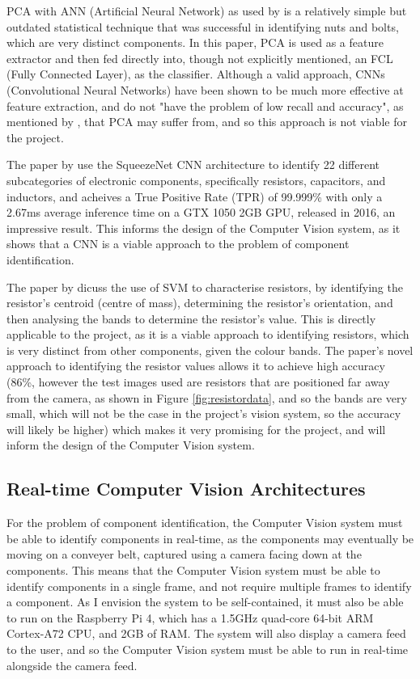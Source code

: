 PCA with ANN (Artificial Neural Network) as used by \citet{Dhenge2013MechanicalNS} is a relatively simple but outdated statistical technique that was successful in identifying nuts and bolts, which are very distinct components. 
In this paper, PCA is used as a feature extractor and then fed directly into, though not explicitly mentioned, an FCL (Fully Connected Layer), as the classifier. Although a valid approach, CNNs (Convolutional Neural Networks) have been shown to be much more
effective at feature extraction, and do not "have the problem of low recall and accuracy", as mentioned by \citet{Xu2020}, that PCA may suffer from, and so this approach is not viable for the project. 

The paper by \citet{Xu2020} use the SqueezeNet CNN architecture to identify 22 different subcategories of electronic components, specifically resistors, capacitors, and inductors, and acheives a True Positive Rate (TPR) of 99.999\% with only a 2.67ms average inference time on a 
GTX 1050 2GB GPU, released in 2016, an impressive result. This informs the design of the Computer Vision system, as it shows that a CNN is a viable approach to the problem of component identification.

The paper by \citet{8939034} dicuss the use of SVM to characterise resistors, by identifying the resistor's centroid (centre of mass), determining the resistor's orientation, and then analysing the bands to determine the resistor's value.
This is directly applicable to the project, as it is a viable approach to identifying resistors, which is very distinct from other components, given the colour bands. The paper's novel approach to identifying the resistor values allows it to achieve high accuracy (86\%, however
the test images used are resistors that are positioned far away from the camera, as shown in Figure \ref*{fig:resistordata}, and so the bands are very small, which will not be the case in the project's vision system, so the accuracy will likely be higher) which makes it very promising for the project,
and will inform the design of the Computer Vision system.


\subsection{Real-time Computer Vision Architectures}
For the problem of component identification, the Computer Vision system must be able to identify components in real-time, as the components may eventually be moving on a conveyer belt, captured using
a camera facing down at the components. This means that the Computer Vision system must be able to identify components in a single frame, and not require multiple frames to identify a component.
As I envision the system to be self-contained, it must also be able to run on the Raspberry Pi 4, which has a 1.5GHz quad-core 64-bit ARM Cortex-A72 CPU, and 2GB of RAM. 
The system will also display a camera feed to the user, and so the Computer Vision system must be able to run in real-time alongside the camera feed.

